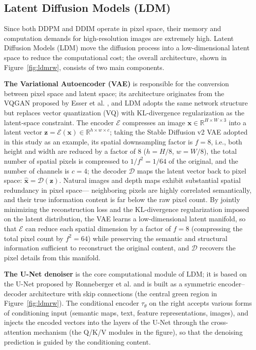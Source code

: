 \subsection{Latent Diffusion Models (LDM)}

Since both DDPM and DDIM operate in pixel space,
their memory and computation demands for high-resolution images are extremely high.
Latent Diffusion Models (LDM) \cite{ldm}
move the diffusion process into a low-dimensional latent space to reduce the computational cost;
the overall architecture, shown in Figure~\ref{fig:ldmrw}, consists of two main components.

\textbf{The Variational Autoencoder (VAE)}
is responsible for the conversion between pixel space and latent space;
its architecture originates from the VQGAN proposed by Esser et al. \cite{vqgan},
and LDM adopts the same network structure but replaces vector quantization (VQ) with KL-divergence regularization as the latent-space constraint.
The encoder $\mathcal{E}$ compresses an image $\mathbf{x} \in \mathbb{R}^{H \times W \times 3}$
into a latent vector $\mathbf{z} = \mathcal{E}(\mathbf{x}) \in \mathbb{R}^{h \times w \times c}$;
taking the Stable Diffusion v2 VAE adopted in this study as an example,
its spatial downsampling factor is $f=8$,
i.e., both height and width are reduced by a factor of 8 ($h = H/8$, $w = W/8$),
the total number of spatial pixels is compressed to $1/f^2 = 1/64$ of the original, and the number of channels is $c = 4$;
the decoder $\mathcal{D}$ maps the latent vector back to pixel space: $\hat{\mathbf{x}} = \mathcal{D}(\mathbf{z})$.
Natural images and depth maps exhibit substantial spatial redundancy in pixel space---
neighboring pixels are highly correlated semantically, and their true information content is far below the raw pixel count.
By jointly minimizing the reconstruction loss and
the KL-divergence regularization imposed on the latent distribution,
the VAE learns a low-dimensional latent manifold,
so that $\mathcal{E}$ can reduce each spatial dimension by a factor of $f=8$ (compressing the total pixel count by $f^2=64$)
while preserving the semantic and structural information sufficient to reconstruct the original content,
and $\mathcal{D}$ recovers the pixel details from this manifold.

\textbf{The U-Net denoiser} is the core computational module of LDM;
it is based on the U-Net proposed by Ronneberger et al. \cite{unet}
and is built as a symmetric encoder--decoder architecture with skip connections (the central green region in Figure~\ref{fig:ldmrw}).
The conditional encoder $\tau_\theta$ on the right accepts various forms of conditioning input
(semantic maps, text, feature representations, images),
and injects the encoded vectors into the layers of the U-Net
through the cross-attention mechanism (the Q/K/V modules in the figure),
so that the denoising prediction is guided by the conditioning content.

